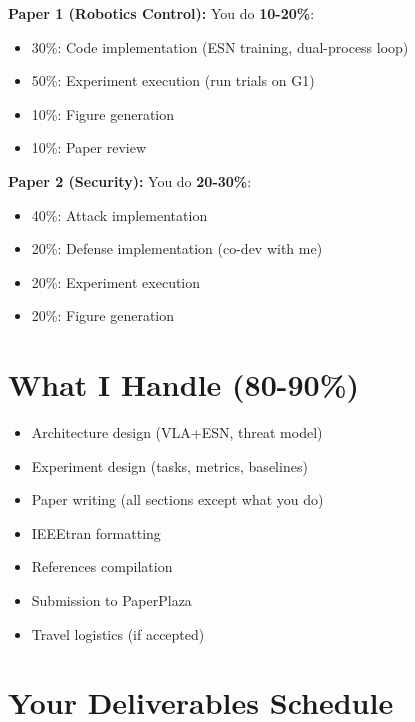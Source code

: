 \documentclass[11pt]{article}
\begin{document}
\textbf{Paper 1 (Robotics Control):} You do \textbf{10-20\%}:
\begin{itemize}
    \item 30\%: Code implementation (ESN training, dual-process loop)
    \item 50\%: Experiment execution (run trials on G1)
    \item 10\%: Figure generation
    \item 10\%: Paper review
\end{itemize}

\textbf{Paper 2 (Security):} You do \textbf{20-30\%}:
\begin{itemize}
    \item 40\%: Attack implementation
    \item 20\%: Defense implementation (co-dev with me)
    \item 20\%: Experiment execution
    \item 20\%: Figure generation
\end{itemize}

\section{What I Handle (80-90\%)}
\begin{itemize}
    \item Architecture design (VLA+ESN, threat model)
    \item Experiment design (tasks, metrics, baselines)
    \item Paper writing (all sections except what you do)
    \item IEEEtran formatting
    \item References compilation
    \item Submission to PaperPlaza
    \item Travel logistics (if accepted)
\end{itemize}

\section{Your Deliverables Schedule}
\end{document}
